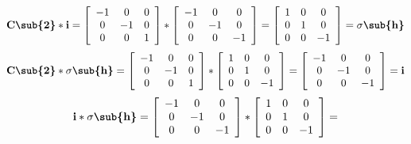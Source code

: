 \begin{enumerate}
  \begin{align*}
    \textbf{C\sub{2}}*\textbf{i} = 
    \left[\begin{array}{ccc}
      -1 & 0 & 0 \\
      0 & -1 & 0 \\
      0 & 0 & 1
    \end{array}\right]*
    \left[\begin{array}{ccc}
      -1 & 0 & 0 \\
      0 & -1 & 0 \\
      0 & 0 & -1
    \end{array}\right] = 
    \left[\begin{array}{ccc}
      1 & 0 & 0 \\
      0 & 1 & 0 \\
      0 & 0 & -1
    \end{array}\right] = \textbf{$\sigma$\sub{h}}
  \end{align*}
  \begin{align*}
    \textbf{C\sub{2}}*\textbf{$\sigma$\sub{h}} = 
    \left[\begin{array}{ccc}
      -1 & 0 & 0 \\
      0 & -1 & 0 \\
      0 & 0 & 1
    \end{array}\right]*
    \left[\begin{array}{ccc}
      1 & 0 & 0 \\
      0 & 1 & 0 \\
      0 & 0 & -1
    \end{array}\right] = 
    \left[\begin{array}{ccc}
      -1 & 0 & 0 \\
      0 & -1 & 0 \\
      0 & 0 & -1
    \end{array}\right] = \textbf{i}
  \end{align*}
  \begin{align*}
    \textbf{i}*\textbf{$\sigma$\sub{h}} = 
    \left[\begin{array}{ccc}
      -1 & 0 & 0 \\
      0 & -1 & 0 \\
      0 & 0 & -1
    \end{array}\right]*
    \left[\begin{array}{ccc}
      1 & 0 & 0 \\
      0 & 1 & 0 \\
      0 & 0 & -1
    \end{array}\right] = 

\end{align*}
\end{enumerate}
